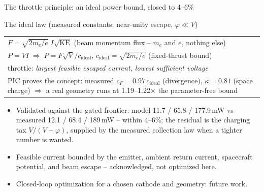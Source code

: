 \documentclass[10pt,aspectratio=169]{beamer}
\begin{document}
\begin{frame}{The throttle principle: an ideal power bound, closed to 4--6\%}
  \begin{block}{The ideal law (measured constants; near-unity escape, $\varphi \ll V$)}
    \centering
    \begin{tabular}{l}
      $F = \sqrt{2m_e/e}\; I\sqrt{\mathrm{KE}}$
        \hfill (beam momentum flux -- $m_e$ and $e$, nothing else)\\[0.4ex]
      $P = V I \;\Rightarrow\; P = F\sqrt{V}/c_{\mathrm{ideal}}$,\quad
        $c_{\mathrm{ideal}} = \sqrt{2m_e/e}$
        \hfill (fixed-thrust bound)\\[0.4ex]
      throttle: \emph{largest feasible escaped current, lowest sufficient
        voltage}\\[0.4ex]
      \footnotesize PIC proves the concept: measured
        $c_F = 0.97\,c_{\mathrm{ideal}}$ (divergence),
        $\kappa = 0.81$ (space charge) $\Rightarrow$ a real geometry runs
        at 1.19--1.22$\times$ the parameter-free bound\\
    \end{tabular}
  \end{block}
  \begin{itemize}\small
    \item Validated against the gated frontier: model 11.7 / 65.8 /
          177.9\,mW vs measured 12.1 / 68.4 / 189\,mW -- within 4--6\%;
          the residual is the charging tax $V/(V-\varphi)$, supplied by the
          measured collection law when a tighter number is wanted.
    \item Feasible current bounded by the emitter, ambient return current,
          spacecraft potential, and beam escape -- acknowledged, not
          optimized here.
    \item Closed-loop optimization for a chosen cathode and geometry:
          future work.
  \end{itemize}
\end{frame}
\end{document}
